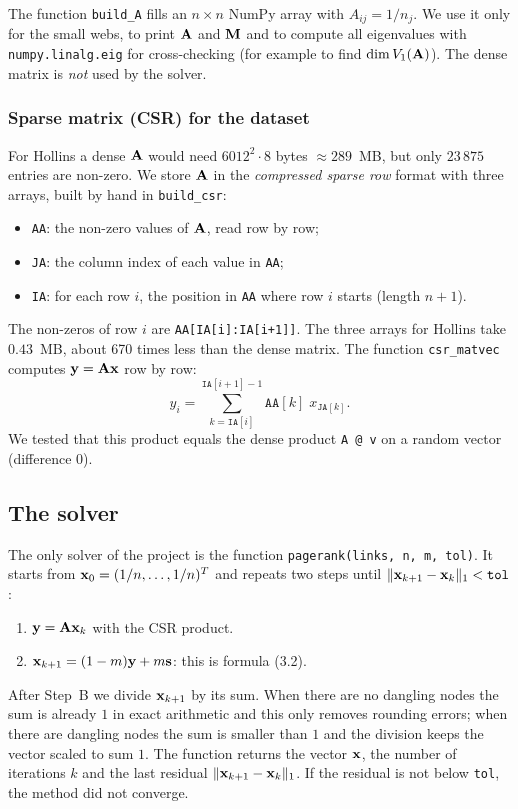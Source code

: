 The function \texttt{build\_A} fills an $n \times n$ NumPy array with $A_{ij} = 1/n_j$.
We use it only for the small webs, to print $\mathbf{A}$ and $\mathbf{M}$ and to compute all eigenvalues with \texttt{numpy.linalg.eig} for cross-checking (for example to find $\dim V_1(\mathbf{A})$).
The dense matrix is \emph{not} used by the solver.

\subsubsection*{Sparse matrix (CSR) for the dataset}

For Hollins a dense $\mathbf{A}$ would need $6012^2 \cdot 8$ bytes $\approx 289$~MB, but only $23\,875$ entries are non-zero.
We store $\mathbf{A}$ in the \emph{compressed sparse row} format with three arrays, built by hand in \texttt{build\_csr}:
\begin{itemize}
  \item \texttt{AA}: the non-zero values of $\mathbf{A}$, read row by row;
  \item \texttt{JA}: the column index of each value in \texttt{AA};
  \item \texttt{IA}: for each row $i$, the position in \texttt{AA} where row $i$ starts (length $n+1$).
\end{itemize}
The non-zeros of row $i$ are \texttt{AA[IA[i]:IA[i+1]]}.
The three arrays for Hollins take $0.43$~MB, about 670 times less than the dense matrix.
The function \texttt{csr\_matvec} computes $\mathbf{y} = \mathbf{A}\mathbf{x}$ row by row:
\[
  y_i = \sum_{k=\texttt{IA}[i]}^{\texttt{IA}[i+1]-1} \texttt{AA}[k]\; x_{\texttt{JA}[k]} .
\]
We tested that this product equals the dense product \texttt{A @ v} on a random vector (difference $0$).

\subsection{The solver}

The only solver of the project is the function \texttt{pagerank(links, n, m, tol)}.
It starts from $\mathbf{x}_0 = (1/n,\dots,1/n)^T$ and repeats two steps until $\|\mathbf{x}_{k+1}-\mathbf{x}_k\|_1 < \texttt{tol}$:
\begin{enumerate}[label=\textbf{Step \Alph*.},leftmargin=*]
  \item $\mathbf{y} = \mathbf{A}\mathbf{x}_k$ with the CSR product.
  \item $\mathbf{x}_{k+1} = (1-m)\mathbf{y} + m\mathbf{s}$: this is formula (3.2).
\end{enumerate}
After Step~B we divide $\mathbf{x}_{k+1}$ by its sum. When there are no dangling nodes the sum is already $1$ in exact arithmetic and this only removes rounding errors; when there are dangling nodes the sum is smaller than $1$ and the division keeps the vector scaled to sum $1$.
The function returns the vector $\mathbf{x}$, the number of iterations $k$ and the last residual $\|\mathbf{x}_{k+1}-\mathbf{x}_k\|_1$.
If the residual is not below \texttt{tol}, the method did not converge.

